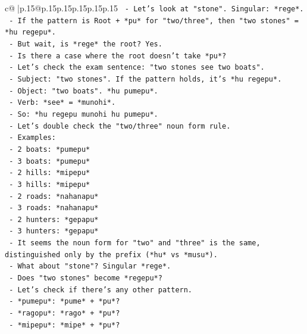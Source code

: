 \documentclass{article}
\begin{document}
{\begin{supertabular}{c@{$\;$}|p{.15\linewidth}@{}p{.15\linewidth}p{.15\linewidth}p{.15\linewidth}p{.15\linewidth}p{.15\linewidth}}
{{{\texttt{        {-} Let's look at "stone". Singular: *rege*.} \\
\texttt{        {-} If the pattern is Root + *pu* for "two/three", then "two stones" = *hu regepu*.} \\
\texttt{        {-} But wait, is *rege* the root? Yes.} \\
\texttt{        {-} Is there a case where the root doesn't take *pu*?} \\
\texttt{        {-} Let's check the exam sentence: "two stones see two boats".} \\
\texttt{        {-} Subject: "two stones". If the pattern holds, it's *hu regepu*.} \\
\texttt{        {-} Object: "two boats". *hu pumepu*.} \\
\texttt{        {-} Verb: *see* = *munohi*.} \\
\texttt{        {-} So: *hu regepu munohi hu pumepu*.} \\
\texttt{        {-} Let's double check the "two/three" noun form rule.} \\
\texttt{        {-} Examples:} \\
\texttt{          {-} 2 boats: *pumepu*} \\
\texttt{          {-} 3 boats: *pumepu*} \\
\texttt{          {-} 2 hills: *mipepu*} \\
\texttt{          {-} 3 hills: *mipepu*} \\
\texttt{          {-} 2 roads: *nahanapu*} \\
\texttt{          {-} 3 roads: *nahanapu*} \\
\texttt{          {-} 2 hunters: *gepapu*} \\
\texttt{          {-} 3 hunters: *gepapu*} \\
\texttt{        {-} It seems the noun form for "two" and "three" is the same, distinguished only by the prefix (*hu* vs *musu*).} \\
\texttt{        {-} What about "stone"? Singular *rege*.} \\
\texttt{        {-} Does "two stones" become *regepu*?} \\
\texttt{        {-} Let's check if there's any other pattern.} \\
\texttt{        {-} *pumepu*: *pume* + *pu*?} \\
\texttt{        {-} *ragopu*: *rago* + *pu*?} \\
\texttt{        {-} *mipepu*: *mipe* + *pu*?} \\
}}}
\end{supertabular}}
\end{document}
